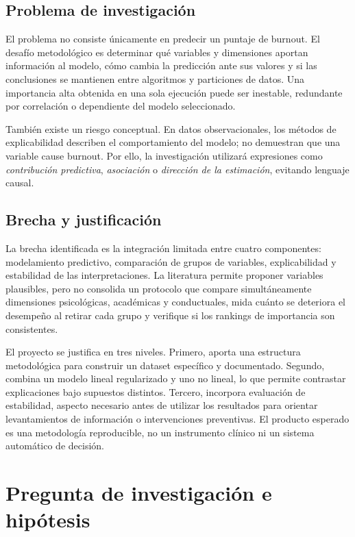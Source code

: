 \documentclass[11pt,a4paper]{article}
\begin{document}
\subsection{Problema de investigación}

El problema no consiste únicamente en predecir un puntaje de burnout. El desafío metodológico es determinar qué variables y dimensiones aportan información al modelo, cómo cambia la predicción ante sus valores y si las conclusiones se mantienen entre algoritmos y particiones de datos. Una importancia alta obtenida en una sola ejecución puede ser inestable, redundante por correlación o dependiente del modelo seleccionado.

También existe un riesgo conceptual. En datos observacionales, los métodos de explicabilidad describen el comportamiento del modelo; no demuestran que una variable cause burnout. Por ello, la investigación utilizará expresiones como \emph{contribución predictiva}, \emph{asociación} o \emph{dirección de la estimación}, evitando lenguaje causal.

\subsection{Brecha y justificación}

La brecha identificada es la integración limitada entre cuatro componentes: modelamiento predictivo, comparación de grupos de variables, explicabilidad y estabilidad de las interpretaciones. La literatura permite proponer variables plausibles, pero no consolida un protocolo que compare simultáneamente dimensiones psicológicas, académicas y conductuales, mida cuánto se deteriora el desempeño al retirar cada grupo y verifique si los rankings de importancia son consistentes.

El proyecto se justifica en tres niveles. Primero, aporta una estructura metodológica para construir un dataset específico y documentado. Segundo, combina un modelo lineal regularizado y uno no lineal, lo que permite contrastar explicaciones bajo supuestos distintos. Tercero, incorpora evaluación de estabilidad, aspecto necesario antes de utilizar los resultados para orientar levantamientos de información o intervenciones preventivas. El producto esperado es una metodología reproducible, no un instrumento clínico ni un sistema automático de decisión.

\section{Pregunta de investigación e hipótesis}
\end{document}
